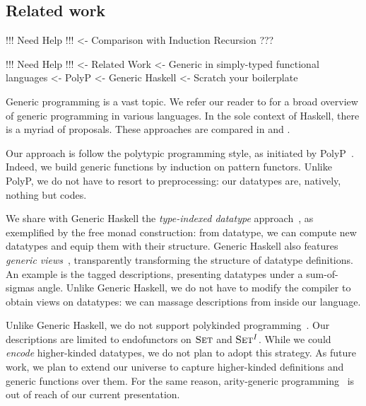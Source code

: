 \subsection{Related work}

\begin{wstructure}
!!! Need Help !!!
<- Comparison with Induction Recursion
    ???
\end{wstructure}


\begin{wstructure}
!!! Need Help !!!
<- Related Work
    <- Generic in simply-typed functional languages
        <- PolyP \cite{jansson:polyp}
        <- Generic Haskell \cite{hinze:generic-haskell}
        <- Scratch your boilerplate \cite{spj:syb}
\end{wstructure}

Generic programming is a vast topic. We refer our reader to
\citet{garcia:generic-comparative-study} for a broad overview of
generic programming in various languages. In the sole context of
Haskell, there is a myriad of proposals. These approaches are compared
in \citet{hinze:generic-approach-comparative} and
\citet{rodriguez:generic-libs-comparative}.

Our approach is follow the polytypic programming style, as initiated
by PolyP~\cite{jansson:polyp}. Indeed, we build generic functions by
induction on pattern functors. Unlike PolyP, we do not have to resort
to preprocessing: our datatypes are, natively, nothing but codes.

We share with Generic Haskell the \emph{type-indexed datatype}
approach~\cite{hinze:generic-haskell}, as exemplified by the free
monad construction: from datatype, we can compute new datatypes and
equip them with their structure. Generic Haskell also features
\emph{generic views}~\cite{holdermans:generic-view}, transparently
transforming the structure of datatype definitions. An example is the
tagged descriptions, presenting datatypes under a sum-of-sigmas
angle. Unlike Generic Haskell, we do not have to modify the compiler
to obtain views on datatypes: we can massage descriptions from inside
our language.

Unlike Generic Haskell, we do not support polykinded
programming~\cite{hinze:polytypic-polykinded}. Our descriptions are
limited to endofunctors on $\Set$ and $\Set^I$. While we could
\emph{encode} higher-kinded datatypes, we do not plan to adopt this
strategy. As future work, we plan to extend our universe to capture
higher-kinded definitions and generic functions over them. For the
same reason, arity-generic programming~\cite{weirich:arity-generic} is
out of reach of our current presentation.


